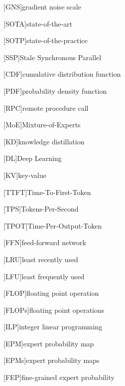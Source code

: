 [GNS]{gradient noise scale}
\newcommand{\GNS}{\ac{GNS}\xspace}

[SOTA]{state-of-the-art}
\newcommand{\SOTA}{\ac{SOTA}\xspace}

[SOTP]{state-of-the-practice}
\newcommand{\SOTP}{\ac{SOTP}\xspace}

[SSP]{Stale Synchronous Parallel}
\newcommand{\SSP}{\ac{SSP}\xspace}

[CDF]{cumulative distribution function}
\newcommand{\CDF}{\ac{CDF}\xspace}

[PDF]{probability density function}
\newcommand{\PDF}{\ac{PDF}\xspace}

[RPC]{remote procedure call}
\newcommand{\RPC}{\ac{RPC}\xspace}

[MoE]{Mixture-of-Experts}
\newcommand{\MoE}{\ac{MoE}\xspace}

[KD]{knowledge distillation}
\newcommand{\KD}{\ac{KD}\xspace}

[DL]{Deep Learning}
\newcommand{\DL}{\ac{DL}\xspace}

[KV]{key-value}
\newcommand{\KV}{\ac{KV}\xspace}

[TTFT]{Time-To-First-Token}
\newcommand{\TTFT}{\ac{TTFT}\xspace}

[TPS]{Tokens-Per-Second}
\newcommand{\TPS}{\ac{TPS}\xspace}

[TPOT]{Time-Per-Output-Token}
\newcommand{\TPOT}{\ac{TPOT}\xspace}

[FFN]{feed-forward network}
\newcommand{\FFN}{\ac{FFN}\xspace}

[LRU]{least recently used}
\newcommand{\LRU}{\ac{LRU}\xspace}

[LFU]{least frequently used}
\newcommand{\LFU}{\ac{LFU}\xspace}

[FLOP]{floating point operation}
\newcommand{\FLOP}{\ac{FLOP}\xspace}

[FLOPs]{floating point operations}
\newcommand{\FLOPs}{\acp{FLOP}\xspace}

[ILP]{integer linear programming}
\newcommand{\ILP}{\ac{ILP}\xspace}

[EPM]{expert probability map}
\newcommand{\EPM}{\ac{EPM}\xspace}

[EPMs]{expert probability maps}
\newcommand{\EPMs}{\acp{EPM}\xspace}

[FEP]{fine-grained expert probability}
\newcommand{\FEP}{\acp{FEP}\xspace}